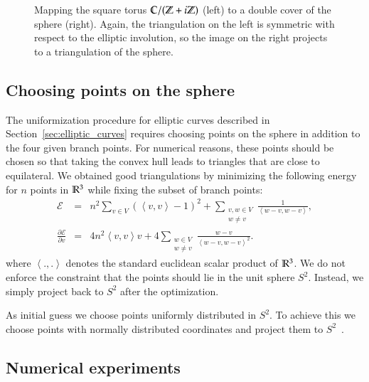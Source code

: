 \documentclass[Thesis]{subfiles}
\begin{document}
\begin{figure}
\centering
{}
\caption{ Mapping the square torus $\mathbb C/(\mathbb Z+i\mathbb Z)$ (left) to a double
  cover of the sphere (right). Again, the triangulation on the left
  is symmetric with respect to the elliptic involution, so the image
  on the right projects to a triangulation of the sphere.}
\label{fig:square_elliptic} 
\end{figure}


\subsection{Choosing points on the sphere}
\label{sec:spherical_triangulations}

The uniformization procedure for elliptic curves described in
Section~\ref{sec:elliptic_curves} requires choosing points on the
sphere in addition to the four given branch points. For numerical
reasons, these points should be chosen so that taking the convex hull
leads to triangles that are close to equilateral. We obtained good
triangulations by minimizing the following energy for $n$ points in
$\mathbb R^{3}$ while fixing the subset of branch points:
\begin{eqnarray}
\mathcal E &=& n^2\sum_{v\in V}\left( \left<v,v\right> - 1\right)^2 +
\sum_{\substack{v,w\in V\\w\neq v}} \frac{1}{\left<w-v,
    w-v\right>},
\\ 
\frac{\partial \mathcal E}{\partial v} &=& 4n^2\left<v,v\right>v + 4\sum_{\substack{w\in V\\w\neq v}}\frac{w-v}{\left<w-v,w-v\right>^2}.
\end{eqnarray}
where $\left<.,.\right>$ denotes the standard euclidean scalar product
of $\mathbb R^{3}$. We do not enforce the constraint that the points should
lie in the unit sphere $S^{2}$. Instead, we simply project back to $S^{2}$
after the optimization.

As initial guess we choose points uniformly distributed in $S^{2}$. To
achieve this we choose points with normally distributed coordinates
and project them to $S^2$~\cite{Muller1959}.


\subsection{Numerical experiments}
\label{sec:numerical_convergence}
\end{document}
